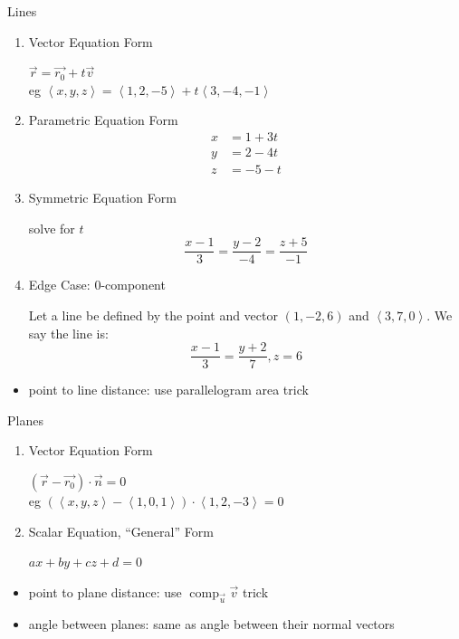 \documentclass[11pt]{article}
\theoremstyle{definition}
\newcommand{\col}[1]{\begin{minipage}{\columnwidth}#1\end{minipage}}
\DeclareMathOperator{\comp}{comp}
\begin{document}
\newpage
\begin{multicols}{2}
  \col{
    Lines
    \begin{enumerate}[(1)]
      \item Vector Equation Form
      
      $\vec{r} = \vec{r_0} + t\vec{v}$ \\
      eg $\left<x,y,z\right> = \left<1,2,-5\right> + t\left<3,-4,-1\right>$
      \item Parametric Equation Form
      \begin{align*}
        x &= 1+3t \\
        y &= 2-4t \\
        z &= -5-t 
      \end{align*}
      
      \item Symmetric Equation Form 
      
      solve for $t$
      \[\frac{x-1}{3} = \frac{y-2}{-4} = \frac{z+5}{-1}\]

      \item Edge Case: 0-component
      
      Let a line be defined by the point and vector $(1,-2,6)$ and $\left<3,7,0\right>$. We say the line is:
      \[ \frac{x-1}{3} = \frac{y+2}{7}, z=6 \]
    \end{enumerate}
    \begin{itemize}
      \item point to line distance: use parallelogram area trick
    \end{itemize}

    Planes
    \begin{enumerate}[(1)]
      \item Vector Equation Form
      
      $(\vec{r}-\vec{r_0})\cdot \vec{n} = 0$ \\
      eg $(\left<x,y,z\right>-\left<1,0,1\right>) \cdot \left<1,2,-3\right> = 0$
      \item Scalar Equation, ``General'' Form
      
      $ax +by +cz +d = 0$
    \end{enumerate}
    \begin{itemize}
      \item point to plane distance: use $\comp_{\vec{u}}\vec{v}$ trick
      \item angle between planes: same as angle between their normal vectors
    \end{itemize}

}
\end{multicols}
\end{document}
